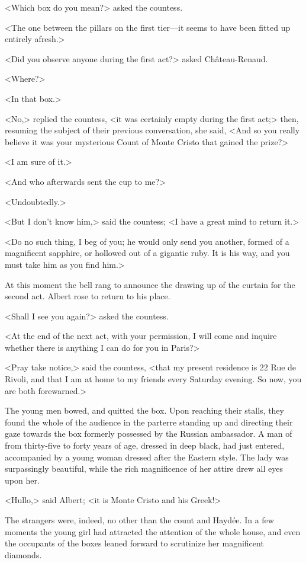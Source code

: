  <Which box do you mean?> asked the countess. 

 <The one between the pillars on the first tier—it seems to have been fitted up entirely afresh.> 

 <Did you observe anyone during the first act?> asked Château-Renaud. 

 <Where?> 

 <In that box.> 

 <No,> replied the countess, <it was certainly empty during the first act;> then, resuming the subject of their previous conversation, she said, <And so you really believe it was your mysterious Count of Monte Cristo that gained the prize?> 

 <I am sure of it.> 

 <And who afterwards sent the cup to me?> 

 <Undoubtedly.> 

 <But I don't know him,> said the countess; <I have a great mind to return it.> 

 <Do no such thing, I beg of you; he would only send you another, formed of a magnificent sapphire, or hollowed out of a gigantic ruby. It is his way, and you must take him as you find him.> 

 At this moment the bell rang to announce the drawing up of the curtain for the second act. Albert rose to return to his place. 

 <Shall I see you again?> asked the countess. 

 <At the end of the next act, with your permission, I will come and inquire whether there is anything I can do for you in Paris?> 

 <Pray take notice,> said the countess, <that my present residence is 22 Rue de Rivoli, and that I am at home to my friends every Saturday evening. So now, you are both forewarned.> 

 The young men bowed, and quitted the box. Upon reaching their stalls, they found the whole of the audience in the parterre standing up and directing their gaze towards the box formerly possessed by the Russian ambassador. A man of from thirty-five to forty years of age, dressed in deep black, had just entered, accompanied by a young woman dressed after the Eastern style. The lady was surpassingly beautiful, while the rich magnificence of her attire drew all eyes upon her. 

 <Hullo,> said Albert; <it is Monte Cristo and his Greek!> 

 The strangers were, indeed, no other than the count and Haydée. In a few moments the young girl had attracted the attention of the whole house, and even the occupants of the boxes leaned forward to scrutinize her magnificent diamonds. 

